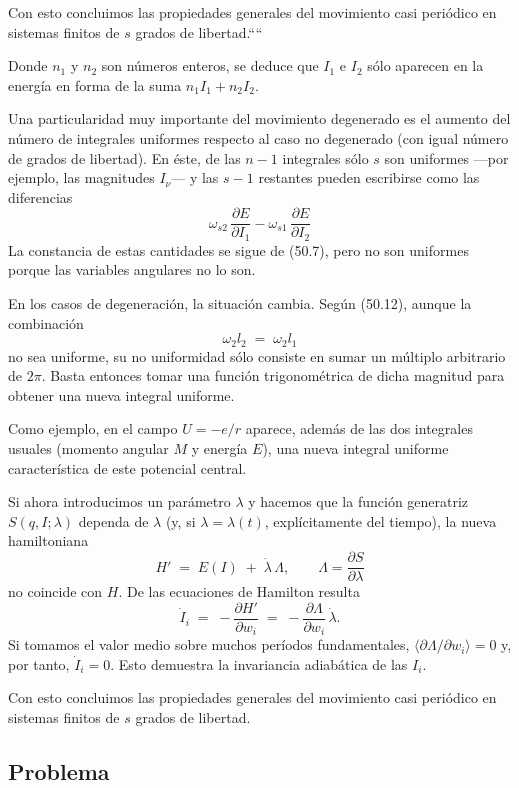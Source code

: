 \documentclass[12pt]{article}
\begin{document}
Con esto concluimos las propiedades generales del movimiento casi periódico en sistemas finitos de \(s\) grados de libertad.````%

Donde \(n_1\) y \(n_2\) son números enteros, se deduce que \(I_1\) e \(I_2\) sólo aparecen en la energía en forma de la suma \(n_1I_1 + n_2I_2\).

Una particularidad muy importante del movimiento degenerado es el aumento del número de integrales uniformes respecto al caso no degenerado (con igual número de grados de libertad). En éste, de las \(n-1\) integrales sólo \(s\) son uniformes —por ejemplo, las magnitudes \(I_\nu\)— y las \(s-1\) restantes pueden escribirse como las diferencias
\[
\omega_{s2}\,\frac{\partial E}{\partial I_1}
- \omega_{s1}\,\frac{\partial E}{\partial I_2}
\tag{50.13}
\]
La constancia de estas cantidades se sigue de (50.7), pero no son uniformes porque las variables angulares no lo son.

En los casos de degeneración, la situación cambia. Según (50.12), aunque la combinación
\[
\omega_{2}l_2 \;=\;\omega_{2}l_1
\tag{50.14}
\]
no sea uniforme, su no uniformidad sólo consiste en sumar un múltiplo arbitrario de \(2\pi\). Basta entonces tomar una función trigonométrica de dicha magnitud para obtener una nueva integral uniforme.

Como ejemplo, en el campo \(U=-e/r\) aparece, además de las dos integrales usuales (momento angular \(M\) y energía \(E\)), una nueva integral uniforme característica de este potencial central.

Si ahora introducimos un parámetro \(\lambda\) y hacemos que la función generatriz \(S(q,I;\lambda)\) dependa de \(\lambda\) (y, si \(\lambda=\lambda(t)\), explícitamente del tiempo), la nueva hamiltoniana
\[
H' \;=\;E(I)\;+\;\dot\lambda\,\Lambda,
\qquad
\Lambda = \frac{\partial S}{\partial \lambda}
\]
no coincide con \(H\). De las ecuaciones de Hamilton resulta
\[
\dot I_i \;=\; -\frac{\partial H'}{\partial w_i}
\;=\; -\frac{\partial\Lambda}{\partial w_i}\,\dot\lambda.
\tag{50.15}
\]
Si tomamos el valor medio sobre muchos períodos fundamentales, \(\langle\partial\Lambda/\partial w_i\rangle=0\) y, por tanto, \(\dot I_i=0\). Esto demuestra la invariancia adiabática de las \(I_i\).

Con esto concluimos las propiedades generales del movimiento casi periódico en sistemas finitos de \(s\) grados de libertad.

\subsection*{Problema}
\end{document}
